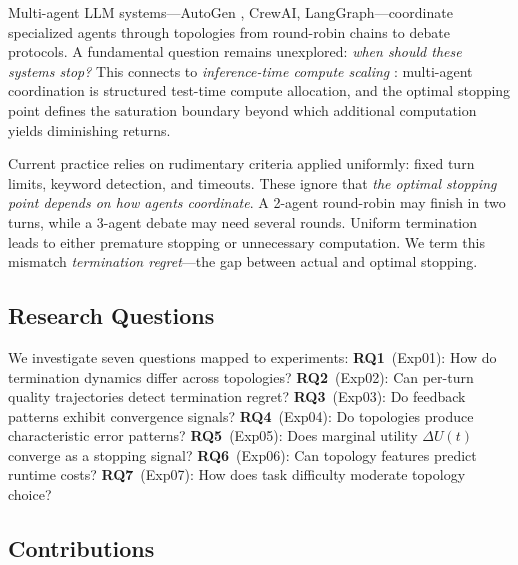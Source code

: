 \documentclass{article}
\begin{document}
Multi-agent LLM systems---AutoGen \citep{wu2023autogen}, CrewAI, LangGraph---coordinate specialized agents through topologies from round-robin chains to debate protocols. A fundamental question remains unexplored: \emph{when should these systems stop?} This connects to \emph{inference-time compute scaling} \citep{snell2024scaling}: multi-agent coordination is structured test-time compute allocation, and the optimal stopping point defines the saturation boundary beyond which additional computation yields diminishing returns.

Current practice relies on rudimentary criteria applied uniformly: fixed turn limits, keyword detection, and timeouts. These ignore that \emph{the optimal stopping point depends on how agents coordinate}. A 2-agent round-robin may finish in two turns, while a 3-agent debate may need several rounds. Uniform termination leads to either premature stopping or unnecessary computation. We term this mismatch \emph{termination regret}---the gap between actual and optimal stopping.

\subsection{Research Questions}
\vspace{-1mm}

We investigate seven questions mapped to experiments:
\textbf{RQ1}~(Exp01): How do termination dynamics differ across topologies?
\textbf{RQ2}~(Exp02): Can per-turn quality trajectories detect termination regret?
\textbf{RQ3}~(Exp03): Do feedback patterns exhibit convergence signals?
\textbf{RQ4}~(Exp04): Do topologies produce characteristic error patterns?
\textbf{RQ5}~(Exp05): Does marginal utility $\Delta U(t)$ converge as a stopping signal?
\textbf{RQ6}~(Exp06): Can topology features predict runtime costs?
\textbf{RQ7}~(Exp07): How does task difficulty moderate topology choice?

\subsection{Contributions}
\vspace{-1mm}
\end{document}
